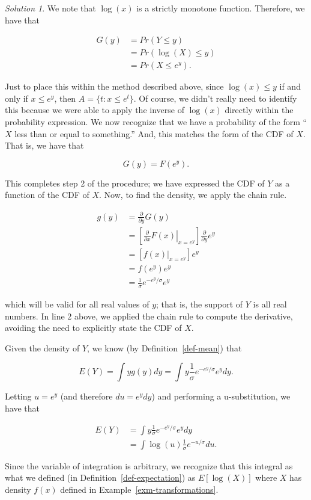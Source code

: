 \documentclass[
  letterpaper,
  DIV=11,
  numbers=noendperiod]{scrreprt}
\theoremstyle{definition}
\theoremstyle{plain}
\theoremstyle{definition}
\theoremstyle{remark}
\newtheorem*{solution}{Solution}
\begin{document}
\begin{solution}

We note that \(\log(x)\) is a strictly monotone function. Therefore, we
have that

\[
\begin{aligned}
  G(y) &= Pr(Y \leq y) \\
    &= Pr(\log(X) \leq y) \\
    &= Pr\left(X \leq e^y\right).
\end{aligned}
\]

Just to place this within the method described above, since
\(\log(x) \leq y\) if and only if \(x \leq e^y\), then
\(A = \{t: x \leq e^t\}\). Of course, we didn't really need to identify
this because we were able to apply the inverse of \(\log(x)\) directly
within the probability expression. We now recognize that we have a
probability of the form ``\(X\) less than or equal to something.'' And,
this matches the form of the CDF of \(X\). That is, we have that

\[G(y) = F\left(e^y\right).\]

This completes step 2 of the procedure; we have expressed the CDF of
\(Y\) as a function of the CDF of \(X\). Now, to find the density, we
apply the chain rule.

\[
\begin{aligned}
  g(y) 
    &= \frac{\partial}{\partial y} G(y) \\
    &= \left[\left.\frac{\partial}{\partial x} F(x)\right|_{x = e^y}\right] \frac{\partial}{\partial y} e^y \\
    &= \left[\left. f(x) \right|_{x = e^y}\right] e^y \\
    &= f\left(e^y\right) e^y \\
    &= \frac{1}{\sigma} e^{-e^y/\sigma} e^y
\end{aligned}
\]

which will be valid for all real values of \(y\); that is, the support
of \(Y\) is all real numbers. In line 2 above, we applied the chain rule
to compute the derivative, avoiding the need to explicitly state the CDF
of \(X\).

Given the density of \(Y\), we know (by Definition~\ref{def-mean}) that

\[E(Y) = \int y g(y) dy = \int y \frac{1}{\sigma} e^{-e^{y}/\sigma} e^{y} dy.\]

Letting \(u = e^y\) (and therefore \(du = e^y dy\)) and performing a
u-substitution, we have that

\[
\begin{aligned}
  E(Y)
    &= \int y\frac{1}{\sigma} e^{-e^{y}/\sigma} e^{y} dy \\
    &= \int \log(u) \frac{1}{\sigma} e^{-u / \sigma} du.
\end{aligned}
\]

Since the variable of integration is arbitrary, we recognize that this
integral as what we defined (in Definition~\ref{def-expectation}) as
\(E\left[\log(X)\right]\) where \(X\) has density \(f(x)\) defined in
Example~\ref{exm-transformations}.

\end{solution}
\end{document}
